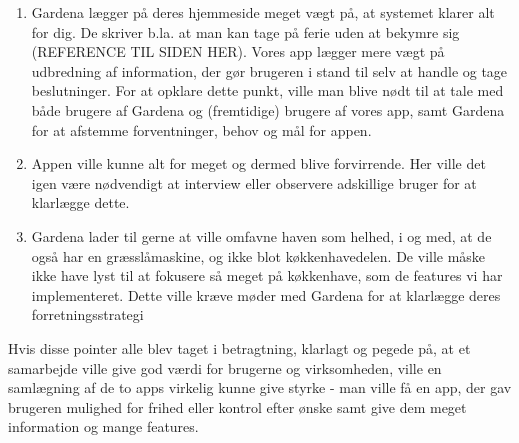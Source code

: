 \begin{enumerate}
    \item{Gardena lægger på deres hjemmeside meget vægt på, at systemet klarer alt for dig. De skriver b.la. at man kan tage på ferie uden at bekymre sig (REFERENCE TIL SIDEN HER). Vores app lægger mere vægt på udbredning af information, der gør brugeren i stand til selv at handle og tage beslutninger. For at opklare dette punkt, ville man blive nødt til at tale med både brugere af Gardena og (fremtidige) brugere af vores app, samt Gardena for at afstemme forventninger, behov og mål for appen.}
    \item{Appen ville kunne alt for meget og dermed blive forvirrende. Her ville det igen være nødvendigt at interview eller observere adskillige bruger for at klarlægge dette.}
    \item{Gardena lader til gerne at ville omfavne haven som helhed, i og med, at de også har en græsslåmaskine, og ikke blot køkkenhavedelen. De ville måske ikke have lyst til at fokusere så meget på køkkenhave, som de features vi har implementeret. Dette ville kræve møder med Gardena for at klarlægge deres forretningsstrategi}
\end{enumerate}

Hvis disse pointer alle blev taget i betragtning, klarlagt og pegede på, at et samarbejde ville give god værdi for brugerne og virksomheden, ville en samlægning af de to apps virkelig kunne give styrke - man ville få en app, der gav brugeren mulighed for frihed eller kontrol efter ønske samt give dem meget information og mange features. 



